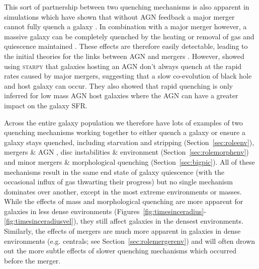 \documentclass[useAMS,usenatbib]{mn2e}
\begin{document}
This sort of partnership between two quenching mechanisms is also apparent in simulations which have shown that without AGN feedback a major merger cannot fully quench a galaxy \citep{springel05b}. In combination with a major merger however, a massive galaxy can be completely quenched by the heating or removal of gas and quiescence maintained \citep{conselice03, springel05b, hopkins08a, pontzen16}. These effects are therefore easily detectable, leading to the initial theories for the links between AGN and mergers \citep{merritt01, hopkins06b, hopkins08a, hopkins08b, peng07, jahnke11}. However, \cite{smethurst16} showed using \textsc{starpy} that galaxies hosting an AGN don't always quench at the rapid rates caused by major mergers, suggesting that a slow co-evolution of black hole and host galaxy can occur. They also showed that rapid quenching is only inferred for low mass AGN host galaxies where the AGN can have a greater impact on the galaxy SFR. 

Across the entire galaxy population we therefore have lots of examples of two quenching mechanisms working together to either quench a galaxy or ensure a galaxy stays quenched, including starvation and stripping (Section~\ref{sec:roleenv}), mergers \& AGN \citep{smethurst15, smethurst16}, disc instabilities \&  environment (Section~\ref{sec:rolemorphenv}) and minor mergers \& morphological quenching (Section~\ref{sec:bigpic}). All of these mechanisms result in the same end state of galaxy quiescence (with the occasional influx of gas thwarting their progress) but no single mechanism dominates over another, except in the most extreme environments or masses. While the effects of mass and morphological quenching are more apparent for galaxies in less dense environments (Figures~\ref{fig:timesinceradius}-\ref{fig:timesinceradiusvel}), they still affect galaxies in the densest environments. Similarly, the effects of mergers are much more apparent in galaxies in dense environments (e.g. centrals; see Section~\ref{sec:rolemergerenv}) and will often drown out the more subtle effects of slower quenching mechanisms which occurred before the merger. %
\end{document}
